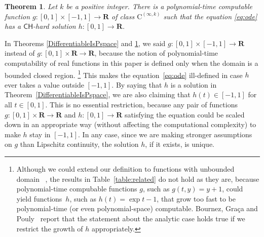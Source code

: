 \documentclass{lmcs}
\newtheorem{theorem}{Theorem}%
\theoremstyle{definition}
\theoremstyle{remark}
\newcommand{\R}{\mathbf R}
\newcommand{\classCH}{\mathsf{CH}}
\newcommand{\classC}{\mathrm C}
\begin{document}
 \begin{theorem}
  \label{KTimesIsCH}
Let $k$ be a positive integer. 
There is a polynomial-time computable function
$g \colon [0,1] \times [-1,1] \to \R$ 
of class $\classC ^{(\infty, k)}$ such that
the equation \eqref{eq:ode} has a 
$\classCH$-hard solution $h \colon [0, 1] \to \R$. 
 \end{theorem}

In Theorems \ref{DifferentiableIsPspace} and \ref{KTimesIsCH}, 
we said
$g \colon [0,1] \times [-1, 1] \to \R$ instead of 
$g \colon [0,1] \times \R \to \R$, because
the notion of polynomial-time computability of real functions 
in this paper is defined only when the domain is a bounded closed region.%
\footnote{%
Although we could extend our definition to 
functions with unbounded domain~%
\cite[Sect.~4.1]{kawamura2010operators}, 
the results in Table~\ref{table:related} 
do not hold as they are, 
because polynomial-time compubable functions $g$, 
such as $g (t, y) = y + 1$, 
could yield functions~$h$, such as $h (t) = \exp t - 1$, 
that grow too fast to be polynomial-time (or even polynomial-space) computable. 
Bournez, Gra\c ca and Pouly~%
\cite[Theorem~2]{bournez11:_solvin_analy_differ_equat_in}
report that the statement about the analytic case holds true 
if we restrict the growth of $h$ %
appropriately. 
} 
This makes the equation~\eqref{eq:ode} ill-defined 
in case $h$ ever takes a value outside $[-1, 1]$. 
By saying that $h$ is a solution in Theorem~\ref{DifferentiableIsPspace}, 
we are also claiming that 
$h (t) \in [-1, 1]$ for all $t \in [0, 1]$. 
This is no essential restriction, 
because any pair of functions 
$g \colon [0,1] \times \R \to \R$ and $h \colon [0, 1] \to \R$
satisfying the equation
could be scaled down in an appropriate way 
(without affecting the computational complexity)
to make $h$ stay in $[-1, 1]$. 
In any case, 
since we are making stronger assumptions on $g$ than Lipschitz continuity, 
the solution $h$, if it exists, is unique. 
\end{document}
